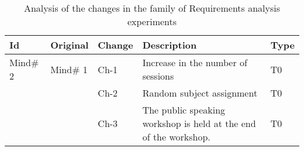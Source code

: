 
\begin{table}
\caption{Analysis of the changes in the family of Requirements analysis experiments}
\label{tab:changesALE}
\begin{minipage}{6cm}

\begin{tabular}{| l | l | l |p{6cm} | p{1cm}|}
\hline
\textbf{Id} & \textbf{Original} & \textbf{Change}  & \textbf{Description}& \textbf{Type}\\
\hline
Mind\# 2 & Mind\# 1  & Ch-1 & Increase in the number of sessions & T0 \\
~ & ~ & Ch-2 & Random subject assignment & T0 \\
~ & ~ & Ch-3 & The public speaking workshop is held at the end of the workshop. & T0 \\ \hline


\end{tabular}
\end{minipage}
\end{table}
